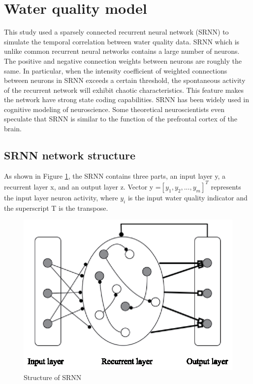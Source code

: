 \documentclass[runningheads]{llncs}
\begin{document}
\section{Water quality model}
This study used a sparsely connected recurrent neural network (SRNN)
to simulate the temporal correlation between water quality data. 
SRNN which is unlike common recurrent neural networks contains a 
large number of neurons. The positive and negative connection 
weights between neurons are roughly the same. In particular, 
when the intensity coefficient of weighted connections between 
neurons in SRNN exceeds a certain threshold, the spontaneous activity 
of the recurrent network will exhibit chaotic characteristics\cite{RN17}. 
This feature makes the network have strong state coding capabilities. 
SRNN has been widely used in cognitive modeling of neuroscience. 
Some theoretical neuroscientists even speculate that SRNN is similar 
to the function of the prefrontal cortex of the brain\cite{RN18}.
\subsection{SRNN network structure}
As shown in Figure \ref{Structure of SRNN}, 
the SRNN contains three parts, an input layer y, a recurrent layer x, and an output layer z.
Vector y =$\left[y_1,y_2,...,y_m\right]^T$ represents the input layer neuron activity,
 where $y_i$ is the input water quality indicator and the superscript T is the transpose.

\begin{figure}[htbp]
\centering
\includegraphics[width=\columnwidth]{Structure_of_SRNN}
\caption{Structure of SRNN}
\label{Structure of SRNN}
\end{figure}
\end{document}

